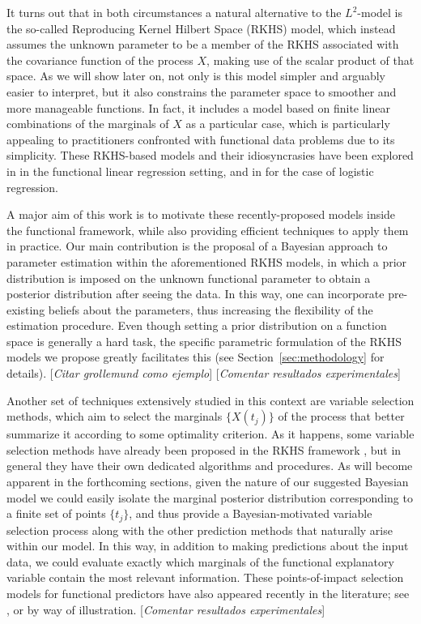\documentclass[ba]{imsart}
\numberwithin{equation}{section}
\theoremstyle{plain}
\newcommand\incomment[2][comment-red]{\color{#1}[\textit{#2}]\color{black}}
\begin{document}
It turns out that in both circumstances a natural alternative to the \(L^2\)-model is the so-called Reproducing Kernel Hilbert Space (RKHS) model, which instead assumes the unknown parameter to be a member of the RKHS associated with the covariance function of the process \(X\), making use of the scalar product of that space. As we will show later on, not only is this model simpler and arguably easier to interpret, but it also constrains the parameter space to smoother and more manageable functions. In fact, it includes a model based on finite linear combinations of the marginals of \(X\) as a particular case, which is particularly appealing to practitioners confronted with functional data problems due to its simplicity. These RKHS-based models and their idiosyncrasies have been explored in \citet{berrendero2019rkhs, berrendero2020general} in the functional linear regression setting, and in \citet{berrendero2018use, berrendero2021functional} for the case of logistic regression.

A major aim of this work is to motivate these recently-proposed models inside the functional framework, while also providing efficient techniques to apply them in practice. Our main contribution is the proposal of a Bayesian approach to parameter estimation within the aforementioned RKHS models, in which a prior distribution is imposed on the unknown functional parameter to obtain a posterior distribution after seeing the data. In this way, one can incorporate pre-existing beliefs about the parameters, thus increasing the flexibility of the estimation procedure. Even though setting a prior distribution on a function space is generally a hard task, the specific parametric formulation of the RKHS models we propose greatly facilitates this (see Section~\ref{sec:methodology} for details). \incomment{Citar grollemund como ejemplo} \incomment{Comentar resultados experimentales}

Another set of techniques extensively studied in this context are variable selection methods, which aim to select the marginals \(\{X(t_j)\}\) of the process that better summarize it according to some optimality criterion. As it happens, some variable selection methods have already been proposed in the RKHS framework \citep[see for example][]{berrendero2019rkhs}, but in general they have their own dedicated algorithms and procedures. As will become apparent in the forthcoming sections, given the nature of our suggested Bayesian model we could easily isolate the marginal posterior distribution corresponding to a finite set of points \(\{t_j\}\), and thus provide a Bayesian-motivated variable selection process along with the other prediction methods that naturally arise within our model. In this way, in addition to making predictions about the input data, we could evaluate exactly which marginals of the functional explanatory variable contain the most relevant information. These points-of-impact selection models for functional predictors have also appeared recently in the literature; see \citet{poss2020superconsistent}, \citet{berrendero2016variable} or \citet{ferraty2010most} by way of illustration. \incomment{Comentar resultados experimentales}
\end{document}
